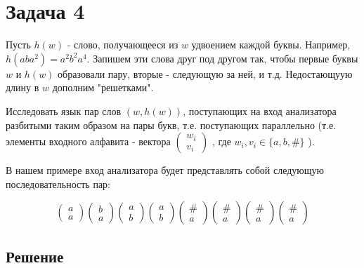 \documentclass[a4paper, 14pt]{article}
\begin{document}
\newpage 


\section{Задача 4}

Пусть $h(w)$ - слово, получающееся из $w$ удвоением каждой буквы. Например, $h(aba^2) = a^{2}b^{2}a^{4}$. Запишем эти слова друг под другом так, чтобы первые буквы $w$ и $h(w)$ образовали пару, вторые - следующую за ней, и т.д. Недостающуую длину в $w$ дополним "решетками".

Исследовать язык пар слов $(w, h(w))$, поступающих на вход анализатора разбитыми таким образом на пары букв, т.е. поступающих параллельно (т.е. элементы входного алфавита - вектора
$
\begin{pmatrix}
	w_i\\
	v_i
\end{pmatrix}
$ 
, где $w_i, v_i \in \{a, b, \# \}$
). 

В нашем примере вход анализатора будет представлять собой следующую последовательность пар:

$$
\begin{pmatrix}
	a\\
	a
\end{pmatrix}
\begin{pmatrix}
	b\\
	a
\end{pmatrix}
\begin{pmatrix}
	a\\
	b	
\end{pmatrix}
\begin{pmatrix}
	a\\
	b	
\end{pmatrix}
\begin{pmatrix}
	\#\\
	a	
\end{pmatrix}
\begin{pmatrix}
	\#\\
	a	
\end{pmatrix}
\begin{pmatrix}
	\#\\
	a	
\end{pmatrix}
\begin{pmatrix}
	\#\\
	a	
\end{pmatrix}
$$

\subsection{Решение}
\end{document}
